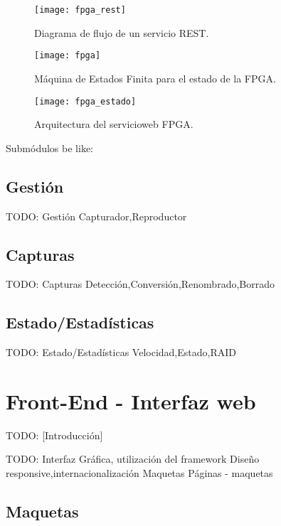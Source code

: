 \begin{figure}[!htp]
  \centering
  \texttt{[image: fpga\_rest]}
  \caption{Diagrama de flujo de un servicio \gls{REST}.}
  \label{fig:fpga_rest}
\end{figure}

\begin{figure}[!htp]
  \centering
  \texttt{[image: fpga]}
  \caption{Máquina de Estados Finita para el estado de la \gls{FPGA}.}
  \label{fig:arquitectura_servicio}
\end{figure}

\begin{figure}[!htp]
  \centering
  \texttt{[image: fpga\_estado]}
  \caption{Arquitectura del \gls{servicioweb} \gls{FPGA}.}
  \label{fig:fpga_estado}
\end{figure}

Submódulos be like:

\subsection{Gestión\label{ssec:dis:gestion}}

TODO: Gestión
  {Capturador,Reproductor}


\subsection{Capturas\label{ssec:dis:capturas}}

TODO: Capturas
  {Detección,Conversión,Renombrado,Borrado}


\subsection{Estado/Estadísticas\label{ssec:dis:estado_estadisticas}}

TODO: Estado/Estadísticas
  {Velocidad,Estado,RAID}


\section{Front-End - Interfaz web\label{sec:dis:interfaz_web}}

TODO: [Introducción]

TODO: Interfaz Gráfica, utilización del framework
  {Diseño responsive,internacionalización}
  {Maquetas}
  Páginas - maquetas

\subsection{Maquetas\label{ssec:dis:maquetas}}

